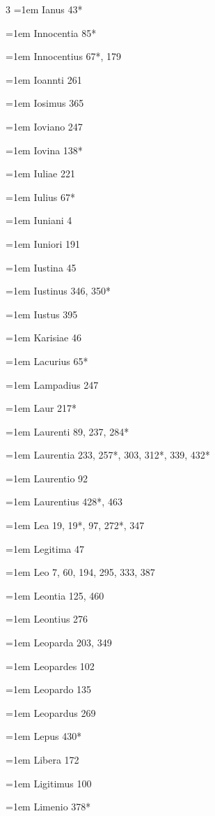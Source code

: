 \begin{multicols}{3}
\hangindent=1em Ianus 43*\par
\hangindent=1em Innocentia 85*\par
\hangindent=1em Innocentius 67*, 179\par
\hangindent=1em Ioannti 261\par
\hangindent=1em Iosimus 365\par
\hangindent=1em Ioviano 247\par
\hangindent=1em Iovina 138*\par
\hangindent=1em Iuliae 221\par
\hangindent=1em Iulius 67*\par
\hangindent=1em Iuniani 4\par
\hangindent=1em Iuniori 191\par
\hangindent=1em Iustina 45\par
\hangindent=1em Iustinus 346, 350*\par
\hangindent=1em Iustus 395\par
\hangindent=1em Karisiae 46\par
\hangindent=1em Lacurius 65*\par
\hangindent=1em Lampadius 247\par
\hangindent=1em Laur 217*\par
\hangindent=1em Laurenti 89, 237, 284*\par
\hangindent=1em Laurentia 233, 257*, 303, 312*, 339, 432*\par
\hangindent=1em Laurentio 92\par
\hangindent=1em Laurentius 428*, 463\par
\hangindent=1em Lea 19, 19*, 97, 272*, 347\par
\hangindent=1em Legitima 47\par
\hangindent=1em Leo 7, 60, 194, 295, 333, 387\par
\hangindent=1em Leontia 125, 460\par
\hangindent=1em Leontius 276\par
\hangindent=1em Leoparda 203, 349\par
\hangindent=1em Leopardes 102\par
\hangindent=1em Leopardo 135\par
\hangindent=1em Leopardus 269\par
\hangindent=1em Lepus 430*\par
\hangindent=1em Libera 172\par
\hangindent=1em Ligitimus 100\par
\hangindent=1em Limenio 378*\par

\end{multicols}
